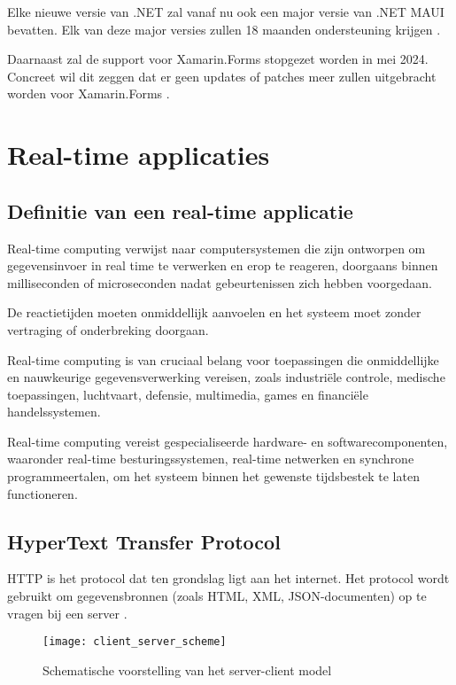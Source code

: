 Elke nieuwe versie van .NET zal vanaf nu ook een major versie van .NET MAUI bevatten. Elk van deze major versies zullen 18 maanden ondersteuning krijgen \autocite{Ramel2022}.

Daarnaast zal de support voor Xamarin.Forms stopgezet worden in mei 2024. Concreet wil dit zeggen dat er geen updates of patches meer zullen uitgebracht worden voor Xamarin.Forms \autocite{Ramel2022}.

\section{Real-time applicaties}
\subsection{Definitie van een real-time applicatie}
Real-time computing verwijst naar computersystemen die zijn ontworpen om gegevensinvoer in real time te verwerken en erop te reageren, doorgaans binnen milliseconden of microseconden nadat gebeurtenissen zich hebben voorgedaan. 

De reactietijden moeten onmiddellijk aanvoelen en het systeem moet zonder vertraging of onderbreking doorgaan. 

Real-time computing is van cruciaal belang voor toepassingen die onmiddellijke en nauwkeurige gegevensverwerking vereisen, zoals industriële controle, medische toepassingen, luchtvaart, defensie, multimedia, games en financiële handelssystemen. 

Real-time computing vereist gespecialiseerde hardware- en softwarecomponenten, waaronder real-time besturingssystemen, real-time netwerken en synchrone programmeertalen, om het systeem binnen het gewenste tijdsbestek te laten functioneren.

\subsection{HyperText Transfer Protocol}
HTTP is het protocol dat ten grondslag ligt aan het internet. Het protocol wordt gebruikt om gegevensbronnen (zoals HTML, XML, JSON-documenten) op te vragen bij een server \autocite{Cloudflare}.

\begin{figure}[H]
    \texttt{[image: client\_server\_scheme]}
    \centering
    \caption{Schematische voorstelling van het server-client model}
    \label{fig:clientServerScheme}
\end{figure}

